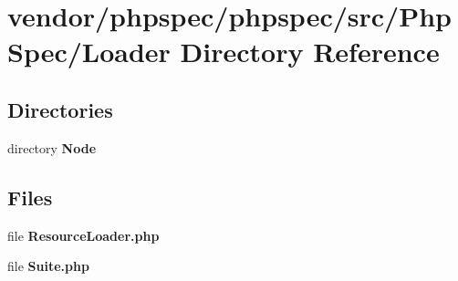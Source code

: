 \section{vendor/phpspec/phpspec/src/\+Php\+Spec/\+Loader Directory Reference}
\label{dir_0be340fa2954dcec4a7ebbffda99c902}
\subsection*{Directories}
\begin{DoxyCompactItemize}
\item 
directory {\bf Node}
\end{DoxyCompactItemize}
\subsection*{Files}
\begin{DoxyCompactItemize}
\item 
file {\bf Resource\+Loader.\+php}
\item 
file {\bf Suite.\+php}
\end{DoxyCompactItemize}
